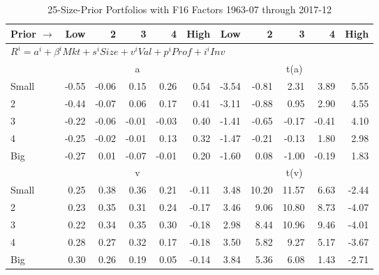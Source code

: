 
\begin{table}[!ht]
\footnotesize
\centering
\caption{25-Size-Prior Portfolios with F16 Factors 1963-07 through 2017-12}
\begin{tabular}{lrrrrrrrrrr}
  \toprule
    Prior $\rightarrow$ & Low & 2 & 3 & 4 & High & Low & 2 & 3 & 4 & High \\ 
  \midrule
  \multicolumn{11}{l}{$R^i=a^i+\beta^iMkt+s^iSize+v^iVal+p^iProf+i^iInv$} \\

  
    
      & \multicolumn{5}{c}{a} & \multicolumn{5}{c}{t(a)}
    
    \\
      \cmidrule(r){2-6} \cmidrule(r){7-11}

    Small   & -0.55  & -0.06  & 0.15  & 0.26  & 0.54  & -3.54  & -0.81  & 2.31  & 3.89  & 5.55  \\
         2  & -0.44  & -0.07  & 0.06  & 0.17  & 0.41  & -3.11  & -0.88  & 0.95  & 2.90  & 4.55  \\
         3  & -0.22  & -0.06  & -0.01  & -0.03  & 0.40  & -1.41  & -0.65  & -0.17  & -0.41  & 4.10  \\
         4  & -0.25  & -0.02  & -0.01  & 0.13  & 0.32  & -1.47  & -0.21  & -0.13  & 1.80  & 2.98  \\
    Big     & -0.27  & 0.01  & -0.07  & -0.01  & 0.20  & -1.60  & 0.08  & -1.00  & -0.19  & 1.83  \\

  
    
      & \multicolumn{5}{c}{v} & \multicolumn{5}{c}{t(v)}
    
    \\
      \cmidrule(r){2-6} \cmidrule(r){7-11}

    Small   & 0.25  & 0.38  & 0.36  & 0.21  & -0.11  & 3.48  & 10.20  & 11.57  & 6.63  & -2.44  \\
         2  & 0.23  & 0.35  & 0.31  & 0.24  & -0.17  & 3.46  & 9.06  & 10.80  & 8.73  & -4.07  \\
         3  & 0.22  & 0.34  & 0.35  & 0.30  & -0.18  & 2.98  & 8.44  & 10.96  & 9.46  & -4.01  \\
         4  & 0.28  & 0.27  & 0.32  & 0.17  & -0.18  & 3.50  & 5.82  & 9.27  & 5.17  & -3.67  \\
    Big     & 0.30  & 0.26  & 0.19  & 0.05  & -0.14  & 3.84  & 5.36  & 6.08  & 1.43  & -2.71  \\

  
    

\end{tabular}
\end{table}
